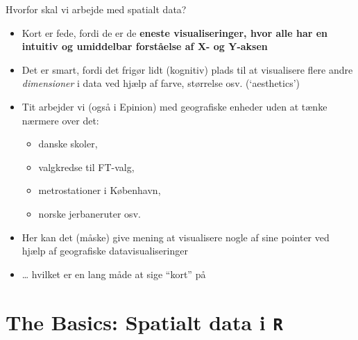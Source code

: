\documentclass[
  8pt,
  ignorenonframetext,
  aspectratio=169]{beamer}
\providecommand{\tightlist}{%
  \setlength{\itemsep}{0pt}\setlength{\parskip}{0pt}}
\begin{document}
\begin{frame}{Hvorfor skal vi arbejde med spatialt data?}
\protect\hypertarget{hvorfor-skal-vi-arbejde-med-spatialt-data-2}{}
\begin{itemize}
\item
  Kort er fede, fordi de er de \textbf{eneste visualiseringer, hvor alle
  har en intuitiv og umiddelbar forståelse af X- og Y-aksen}
\item
  Det er smart, fordi det frigør lidt (kognitiv) plads til at
  visualisere flere andre \emph{dimensioner} i data ved hjælp af farve,
  størrelse osv. (`aesthetics')
\item
  Tit arbejder vi (også i Epinion) med geografiske enheder uden at tænke
  nærmere over det:

  \begin{itemize}
  \tightlist
  \item
    danske skoler,
  \item
    valgkredse til FT-valg,
  \item
    metrostationer i København,
  \item
    norske jerbaneruter osv.
  \end{itemize}
\item
  Her kan det (måske) give mening at visualisere nogle af sine pointer
  ved hjælp af geografiske datavisualiseringer
\item
  \ldots{} hvilket er en lang måde at sige ``kort'' på
\end{itemize}
\end{frame}

\hypertarget{the-basics-spatialt-data-i-r}{%
\section{\texorpdfstring{The Basics: Spatialt data i
\texttt{R}}{The Basics: Spatialt data i R}}\label{the-basics-spatialt-data-i-r}}
\end{document}
